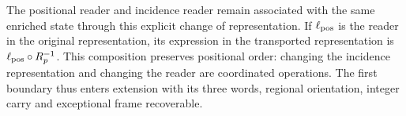 The positional reader and incidence reader remain associated with the same enriched state through this explicit change of representation. If $\ell_{\rm pos}$ is the reader in the original representation, its expression in the transported representation is $\ell_{\rm pos}\circ R_p^{-1}$. This composition preserves positional order: changing the incidence representation and changing the reader are coordinated operations. The first boundary thus enters extension with its three words, regional orientation, integer carry and exceptional frame recoverable.
